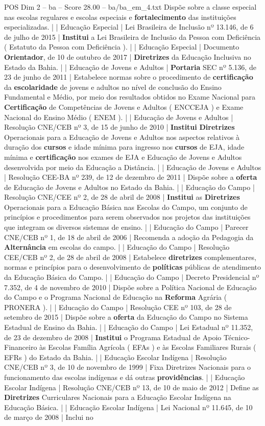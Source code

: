 \begin{textsample}{POS Dim 2 – ba – Score 28.00 – ba/ba\_em\_4.txt}
Dispõe sobre a classe especial nas escolas regulares e escolas especiais e \textbf{fortalecimento} das instituições especializadas. | | Educação Especial | Lei Brasileira de Inclusão nº 13.146, de 6 de julho de 2015 | \textbf{Institui} a Lei Brasileira de Inclusão da Pessoa com Deficiência ( Estatuto da Pessoa com Deficiência ). | | Educação Especial | Documento \textbf{Orientador}, de 10 de outubro de 2017 | \textbf{Diretrizes} da Educação Inclusiva no Estado da Bahia. | | Educação de Jovens e Adultos | \textbf{Portaria} SEC nº 5.136, de 23 de junho de 2011 | Estabelece normas sobre o procedimento de \textbf{certificação} da \textbf{escolaridade} de jovens e adultos no nível de conclusão do Ensino Fundamental e Médio, por meio dos resultados obtidos no Exame Nacional para \textbf{Certificação} de Competências de Jovens e Adultos ( ENCCEJA ) e Exame Nacional do Ensino Médio ( ENEM ). | | Educação de Jovens e Adultos | Resolução CNE/CEB nº 3, de 15 de junho de 2010 | \textbf{Institui} \textbf{Diretrizes} Operacionais para a Educação de Jovens e Adultos nos aspectos relativos à duração dos \textbf{cursos} e idade mínima para ingresso nos \textbf{cursos} de EJA, idade mínima e \textbf{certificação} nos exames de EJA e Educação de Jovens e Adultos desenvolvida por meio da Educação a Distância. | | Educação de Jovens e Adultos | Resolução CEE-BA nº 239, de 12 de dezembro de 2011 | Dispõe sobre a \textbf{oferta} de Educação de Jovens e Adultos no Estado da Bahia. | | Educação do Campo | Resolução CNE/CEE nº 2, de 28 de abril de 2008 | \textbf{Institui} as \textbf{Diretrizes} Operacionais para a Educação Básica nas Escolas do Campo, um conjunto de princípios e procedimentos para serem observados nos projetos das instituições que integram os diversos sistemas de ensino. | | Educação do Campo | Parecer CNE/CEB nº 1, de 18 de abril de 2006 | Recomenda a adoção da Pedagogia da \textbf{Alternância} em escolas do campo. | | Educação do Campo | Resolução CEE/CEB nº 2, de 28 de abril de 2008 | Estabelece \textbf{diretrizes} complementares, normas e princípios para o desenvolvimento de \textbf{políticas} públicas de atendimento da Educação Básica do Campo. | | Educação do Campo | Decreto Presidencial nº 7.352, de 4 de novembro de 2010 | Dispõe sobre a Política Nacional de Educação do Campo e o Programa Nacional de Educação na \textbf{Reforma} Agrária ( PRONERA ). | | Educação do Campo | Resolução CEE nº 103, de 28 de setembro de 2015 | Dispõe sobre a \textbf{oferta} da Educação do Campo no Sistema Estadual de Ensino da Bahia. | | Educação do Campo | Lei Estadual nº 11.352, de 23 de dezembro de 2008 | \textbf{Institui} o Programa Estadual de Apoio Técnico-Financeiro às Escolas Família Agrícola ( EFAs ) e às Escolas Familiares Rurais ( EFRs ) do Estado da Bahia. | | Educação Escolar Indígena | Resolução CNE/CEB nº 3, de 10 de novembro de 1999 | Fixa Diretrizes Nacionais para o funcionamento das escolas indígenas e dá outras \textbf{providências}. | | Educação Escolar Indígena | Resolução CNE/CEB nº 13, de 10 de maio de 2012 | Define as \textbf{Diretrizes} Curriculares Nacionais para a Educação Escolar Indígena na Educação Básica. | | Educação Escolar Indígena | Lei Nacional nº 11.645, de 10 de março de 2008 | Inclui no 
\end{textsample}
